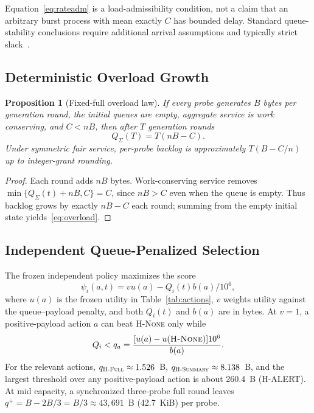 \documentclass[10pt,journal]{IEEEtran}
\newtheorem{proposition}{Proposition}
\newcommand{\Hnone}{\textsc{H-None}}
\newcommand{\Hsummary}{\textsc{H-Summary}}
\newcommand{\Hfull}{\textsc{H-Full}}
\begin{document}
Equation~\eqref{eq:rateadm} is a load-admissibility condition, not a claim
that an arbitrary burst process with mean exactly $C$ has bounded delay.
Standard queue-stability conclusions require additional arrival assumptions
and typically strict slack~\cite{tassiulas1992,neely2010}.

\subsection{Deterministic Overload Growth}
\begin{proposition}[Fixed-full overload law]
\label{prop:overload}
If every probe generates $B$ bytes per generation round, the initial queues
are empty, aggregate service is work conserving, and $C<nB$, then after $T$
generation rounds
\begin{equation}
Q_\Sigma(T)=T(nB-C).
\label{eq:overload}
\end{equation}
Under symmetric fair service, per-probe backlog is approximately
$T(B-C/n)$ up to integer-grant rounding.
\end{proposition}
\begin{proof}
Each round adds $nB$ bytes. Work-conserving service removes
$\min\{Q_\Sigma(t)+nB,C\}=C$, since $nB>C$ even when the queue is empty.
Thus backlog grows by exactly $nB-C$ each round; summing from the empty
initial state yields~\eqref{eq:overload}.
\end{proof}

\subsection{Independent Queue-Penalized Selection}
The frozen independent policy maximizes the score
\begin{equation}
\psi_i(a,t)=v u(a)-Q_i(t)b(a)/10^6,
\label{eq:qpg}
\end{equation}
where $u(a)$ is the frozen utility in Table~\ref{tab:actions}, $v$ weights
utility against the queue--payload penalty, and both $Q_i(t)$ and $b(a)$
are in bytes. At $v=1$, a positive-payload action $a$ can beat \Hnone{}
only while
\begin{equation}
Q_i<q_a=\frac{[u(a)-u(\Hnone)]10^6}{b(a)}.
\label{eq:threshold}
\end{equation}
For the relevant actions, $q_{\Hfull}\approx1.526$~B,
$q_{\Hsummary}\approx8.138$~B, and the largest threshold over any
positive-payload action is about 260.4~B (H-ALERT). At mid capacity, a
synchronized three-probe full round leaves
$q^+=B-2B/3=B/3\approx43{,}691$~B (42.7~KiB) per probe.
\end{document}
